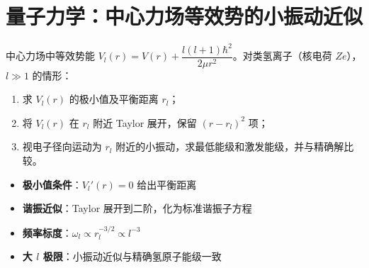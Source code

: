\section{量子力学：中心力场等效势的小振动近似}
\label{sec:central-effective-potential-harmonic}

\begin{modelbox}[题目：中心力场等效势的小振动近似]
中心力场中等效势能 $V_l(r)=V(r)+\dfrac{l(l+1)\hbar^2}{2\mu r^2}$。对类氢离子（核电荷 $Ze$），$l\gg1$ 的情形：
\begin{enumerate}
    \item 求 $V_l(r)$ 的极小值及平衡距离 $r_l$；
    \item 将 $V_l(r)$ 在 $r_l$ 附近 Taylor 展开，保留 $(r-r_l)^2$ 项；
    \item 视电子径向运动为 $r_l$ 附近的小振动，求最低能级和激发能级，并与精确解比较。
\end{enumerate}
\end{modelbox}

\begin{tipbox}[考点快速分析]
\begin{itemize}
    \item \textbf{极小值条件}：$V_l'(r)=0$ 给出平衡距离
    \item \textbf{谐振近似}：Taylor 展开到二阶，化为标准谐振子方程
    \item \textbf{频率标度}：$\omega_l\propto r_l^{-3/2}\propto l^{-3}$
    \item \textbf{大 $l$ 极限}：小振动近似与精确氢原子能级一致
\end{itemize}
\end{tipbox}

